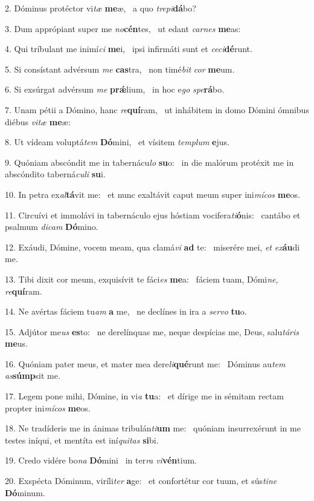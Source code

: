 2. Dóminus protéctor vi\textit{tæ} \textbf{me}æ, \ast\  a quo \textit{tre}\textit{pi}\textbf{dá}bo?\

3. Dum apprópiant super me \textit{no}\textbf{cén}tes, \ast\  ut edant \textit{car}\textit{nes} \textbf{me}as:\

4. Qui tríbulant me inimí\textit{ci} \textbf{me}i, \ast\  ipsi infirmáti sunt et \textit{ce}\textit{ci}\textbf{dé}runt.\

5. Si consístant advérsum \textit{me} \textbf{cas}tra, \ast\  non timé\textit{bit} \textit{cor} \textbf{me}um.\

6. Si exsúrgat advérsum \textit{me} \textbf{prǽ}lium, \ast\  in hoc e\textit{go} \textit{spe}\textbf{rá}bo.\

7. Unam pétii a Dómino, hanc \textit{re}\textbf{quí}ram, \ast\  ut inhábitem in domo Dómini ómnibus diébus \textit{vi}\textit{tæ} \textbf{me}æ:\

8. Ut vídeam voluptá\textit{tem} \textbf{Dó}mini, \ast\  et vísitem \textit{tem}\textit{plum} \textbf{e}jus.\

9. Quóniam abscóndit me in tabernácu\textit{lo} \textbf{su}o: \ast\  in die malórum protéxit me in abscóndito taberná\textit{cu}\textit{li} \textbf{su}i.\

10. In petra ex\textit{al}\textbf{tá}vit me: \ast\  et nunc exaltávit caput meum super ini\textit{mí}\textit{cos} \textbf{me}os.\

11. Circuívi et immolávi in tabernáculo ejus hóstiam vocifera\textit{ti}\textbf{ó}nis: \ast\  cantábo et psalmum \textit{di}\textit{cam} \textbf{Dó}mino.\

12. Exáudi, Dómine, vocem meam, qua clamá\textit{vi} \textbf{ad} te: \ast\  miserére mei, \textit{et} \textit{ex}\textbf{áu}di me.\

13. Tibi dixit cor meum, exquisívit te fáci\textit{es} \textbf{me}a: \ast\  fáciem tuam, Dómi\textit{ne}, \textit{re}\textbf{quí}ram.\

14. Ne avértas fáciem tu\textit{am} \textbf{a} me, \ast\  ne declínes in ira a \textit{ser}\textit{vo} \textbf{tu}o.\

15. Adjútor me\textit{us} \textbf{es}to: \ast\  ne derelínquas me, neque despícias me, Deus, salu\textit{tá}\textit{ris} \textbf{me}us.\

16. Quóniam pater meus, et mater mea dere\textit{li}\textbf{qué}runt me: \ast\  Dóminus au\textit{tem} \textit{as}\textbf{súmp}sit me.\

17. Legem pone mihi, Dómine, in vi\textit{a} \textbf{tu}a: \ast\  et dírige me in sémitam rectam propter ini\textit{mí}\textit{cos} \textbf{me}os.\

18. Ne tradíderis me in ánimas tribulán\textit{ti}\textbf{um} me: \ast\  quóniam insurrexérunt in me testes iníqui, et mentíta est iní\textit{qui}\textit{tas} \textbf{si}bi.\

19. Credo vidére bo\textit{na} \textbf{Dó}mini \ast\  in ter\textit{ra} \textit{vi}\textbf{vén}tium.\

20. Exspécta Dóminum, viríli\textit{ter} \textbf{a}ge: \ast\  et confortétur cor tuum, et sús\textit{ti}\textit{ne} \textbf{Dó}minum.\

